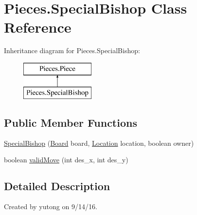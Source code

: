 \hypertarget{classPieces_1_1SpecialBishop}{\section{Pieces.\-Special\-Bishop Class Reference}
\label{classPieces_1_1SpecialBishop}
}
Inheritance diagram for Pieces.\-Special\-Bishop\-:\begin{figure}[H]
\begin{center}
\leavevmode
\includegraphics[height=2.000000cm]{classPieces_1_1SpecialBishop}
\end{center}
\end{figure}
\subsection*{Public Member Functions}
\begin{DoxyCompactItemize}
\item 
\hyperlink{classPieces_1_1SpecialBishop_a8a34e91f32032f3e54bffbe8a701352d}{Special\-Bishop} (\hyperlink{classPieces_1_1Board}{Board} board, \hyperlink{classPieces_1_1Location}{Location} location, boolean owner)
\item 
boolean \hyperlink{classPieces_1_1SpecialBishop_a478a8c0332931da570772e4abe5405fd}{valid\-Move} (int des\-\_\-x, int des\-\_\-y)
\end{DoxyCompactItemize}


\subsection{Detailed Description}
Created by yutong on 9/14/16. 

